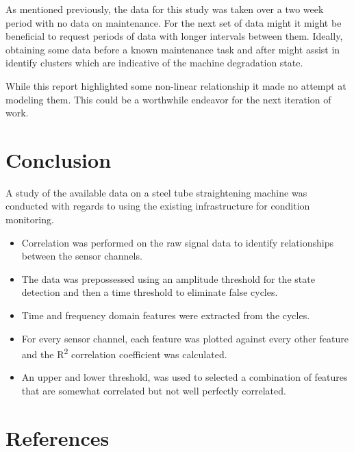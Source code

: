 \documentclass[]{article}
\begin{document}
As mentioned previously, the data for this study was taken over a two week period with no data on maintenance. For the next set of data might it might be beneficial to request periods of data with longer intervals between them. Ideally, obtaining some data before a known maintenance task and after might assist in identify clusters which are indicative of the machine degradation state.

While this report highlighted some non-linear relationship it made no attempt at modeling them. This could be a worthwhile endeavor for the next iteration of work.
\clearpage

\section{Conclusion}
A study of the available data on a steel tube straightening machine was conducted with regards to using the existing infrastructure for condition monitoring.
\begin{itemize}
\item Correlation was performed on the raw signal data to identify relationships between the sensor channels.
\item The data was prepossessed using an amplitude threshold for the state detection and then a time threshold to eliminate false cycles.
\item Time and frequency domain features were extracted from the cycles.
\item For every sensor channel, each feature was plotted against every other feature and the R\textsuperscript{2} correlation coefficient was calculated.
\item An upper and lower threshold, was used to selected a combination of features that are somewhat correlated but not well perfectly correlated.
\end{itemize}
\newpage

\section{References} 
\printbibliography[heading=none] 
\clearpage  
\end{document}
